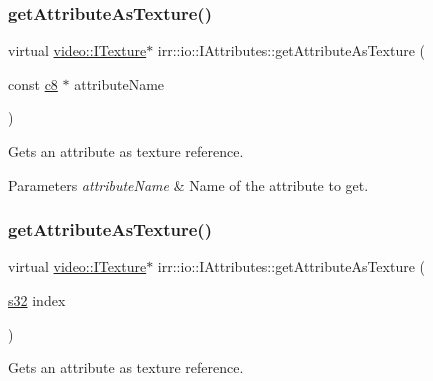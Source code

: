 \subsubsection{\texorpdfstring{get\+Attribute\+As\+Texture()}{getAttributeAsTexture()}\hspace{0.1cm}{\footnotesize\ttfamily [1/2]}}
{\footnotesize\ttfamily virtual \hyperlink{classirr_1_1video_1_1ITexture}{video\+::\+I\+Texture}$\ast$ irr\+::io\+::\+I\+Attributes\+::get\+Attribute\+As\+Texture (\begin{DoxyParamCaption}\item[{const \hyperlink{namespaceirr_a9395eaea339bcb546b319e9c96bf7410}{c8} $\ast$}]{attribute\+Name }\end{DoxyParamCaption})\hspace{0.3cm}{\ttfamily [pure virtual]}}



Gets an attribute as texture reference. 


\begin{DoxyParams}{Parameters}
{\em attribute\+Name} & Name of the attribute to get. \\
\hline
\end{DoxyParams}
\mbox{\label{classirr_1_1io_1_1IAttributes_ad022db880ccf7844c720efceef7c22fc}} 
\subsubsection{\texorpdfstring{get\+Attribute\+As\+Texture()}{getAttributeAsTexture()}\hspace{0.1cm}{\footnotesize\ttfamily [2/2]}}
{\footnotesize\ttfamily virtual \hyperlink{classirr_1_1video_1_1ITexture}{video\+::\+I\+Texture}$\ast$ irr\+::io\+::\+I\+Attributes\+::get\+Attribute\+As\+Texture (\begin{DoxyParamCaption}\item[{\hyperlink{namespaceirr_ac66849b7a6ed16e30ebede579f9b47c6}{s32}}]{index }\end{DoxyParamCaption})\hspace{0.3cm}{\ttfamily [pure virtual]}}



Gets an attribute as texture reference. 



